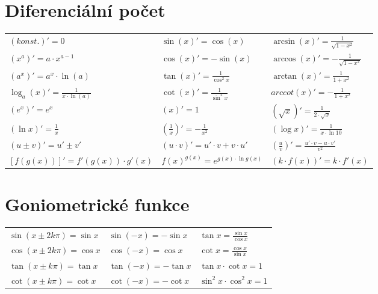 \documentclass{article}
\begin{document}
	\section*{Diferenciální počet}
	\begin{tabular}{p{4cm}p{4cm}p{4cm}}
		$(konst.)' = 0$								&	$\sin(x)' = \cos(x)$							&	$\arcsin(x)' = \frac{1}{\sqrt{1-x^2}}$\\
		$(x^{a})' = a \cdot x^{a-1}$				&	$\cos(x)' = -\sin(x)$							&	$\arccos(x)' = -\frac{1}{\sqrt{1-x^2}}$\\
		$(a^{x})' = a^{x} \cdot \ln(a)$				&	$\tan(x)' = \frac{1}{\cos^2{x}}$				&	$\arctan(x)' = \frac{1}{1+x^2}$\\
		$\log_{a}(x)' = \frac{1}{x \cdot \ln(a)}$	&	$\cot(x)' = \frac{1}{\sin^2{x}}$				&	$arccot(x)' = -\frac{1}{1+x^2}$\\
		$(e^{x})' = e^{x}$							&	$(x)' = 1$										&	$\left(\sqrt{x}\right)' = \frac{1}{2 \cdot \sqrt{x}}$\\
		$(\ln{x})' = \frac{1}{x}$					&	$\left(\frac{1}{x}\right)' = -\frac{1}{x^{2}}$	&	$(\log{x})' = \frac{1}{x \cdot \ln{10}}$\\
		$(u \pm v)' = u' \pm v'$					&	$(u \cdot v)' = u' \cdot v + v \cdot u'$		&	$\left(\frac{u}{v}\right)' = \frac{u' \cdot v - u \cdot v'}{v^{2}}$\\
		$[f(g(x))]' = f'(g(x)) \cdot g'(x)$			&	$f(x)^{g(x)} = e^{g(x) \cdot \ln{g(x)}}$		&	$(k \cdot f(x))' = k \cdot f'(x)$
	\end{tabular}

	\section*{Goniometrické funkce}
	\begin{tabular}{p{4cm}p{4cm}p{4cm}}
		$\sin{(x \pm 2k\pi)} = \sin{x}$				&	$\sin{(-x)} = -\sin{x}$							&	$\tan{x} = \frac{\sin{x}}{\cos{x}}$\\
		$\cos{(x \pm 2k\pi)} = \cos{x}$				&	$\cos{(-x)} = \cos{x}$							&	$\cot{x} = \frac{\cos{x}}{\sin{x}}$\\
		$\tan{(x \pm k\pi)} = \tan{x}$				&	$\tan{(-x)} = -\tan{x}$							&	$\tan{x} \cdot \cot{x} = 1$\\
		$\cot{(x \pm k\pi)} = \cot{x}$				&	$\cot{(-x)} = -\cot{x}$							&	$\sin^{2}{x} \cdot \cos^{2}{x} = 1$
	\end{tabular}
\end{document}
